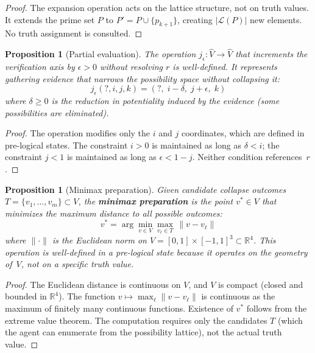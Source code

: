 \documentclass[11pt,a4paper]{article}
\newtheorem{proposition}[theorem]{Proposition}
\begin{document}
\begin{proof}
The expansion operation acts on the lattice structure, not on truth
values. It extends the prime set $P$ to $P' = P \cup \{p_{k+1}\}$,
creating $|\mathcal{L}(P)|$ new elements. No truth assignment is
consulted.
\end{proof}

\begin{proposition}[Partial evaluation]
\label{prop:partial-eval}
The operation $j_\epsilon: \hat{V} \to \hat{V}$ that increments the
verification axis by $\epsilon > 0$ without resolving $r$ is
well-defined. It represents gathering evidence that narrows the
possibility space without collapsing it:
\begin{equation}
j_\epsilon(?, i, j, k) = (?, \; i - \delta, \; j + \epsilon, \; k)
\end{equation}
where $\delta \geq 0$ is the reduction in potentiality induced by the
evidence (some possibilities are eliminated).
\end{proposition}

\begin{proof}
The operation modifies only the $i$ and $j$ coordinates, which are
defined in pre-logical states. The constraint $i > 0$ is maintained as
long as $\delta < i$; the constraint $j < 1$ is maintained as long as
$\epsilon < 1 - j$. Neither condition references~$r$.
\end{proof}

\begin{proposition}[Minimax preparation]
\label{prop:minimax}
Given candidate collapse outcomes
$T = \{v_1, \ldots, v_m\} \subset V$, the \textbf{minimax preparation}
is the point $v^* \in V$ that minimizes the maximum distance to all
possible outcomes:
\begin{equation}
v^* = \arg\min_{v \in V} \max_{v_\ell \in T}
  \, \|v - v_\ell\|
\end{equation}
where $\|\cdot\|$ is the Euclidean norm on
$V = [0,1]\times[-1,1]^3 \subset \mathbb{R}^4$.
This operation is well-defined in a pre-logical state because it
operates on the geometry of~$V$, not on a specific truth value.
\end{proposition}

\begin{proof}
The Euclidean distance is continuous on $V$, and $V$ is compact (closed
and bounded in $\mathbb{R}^4$). The function
$v \mapsto \max_\ell \|v - v_\ell\|$ is continuous as the maximum of
finitely many continuous functions. Existence of $v^*$ follows from the
extreme value theorem. The computation requires only the candidates $T$
(which the agent can enumerate from the possibility lattice), not the
actual truth value.
\end{proof}
\end{document}
